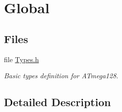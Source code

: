 \hypertarget{group___global__group}{\section{Global}
\label{group___global__group}
}
\subsection*{Files}
\begin{DoxyCompactItemize}
\item 
file \hyperlink{_types_8h}{Types.\+h}
\begin{DoxyCompactList}\small\item\em Basic types definition for A\+Tmega128. \end{DoxyCompactList}\end{DoxyCompactItemize}


\subsection{Detailed Description}
